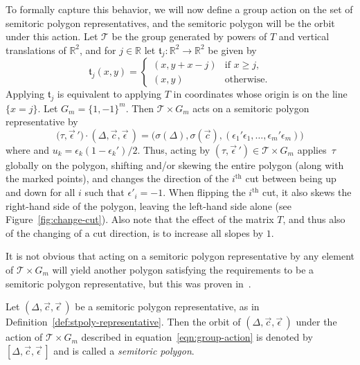 \documentclass[10pt,a4paper]{amsart}
\numberwithin{equation}{section}
\def\R{{\mathbb R}}
\newcommand{\De}{\Delta}
\newcommand{\stpoly}{[\De,\vec{c},\vec{\epsilon}\,]}
\newcommand{\strep}{(\De,\vec{c},\vec{\epsilon}\,)}
\theoremstyle{definition}
\theoremstyle{plain}
\theoremstyle{plain}
\begin{document}
To formally capture this behavior, we will now define a group action on the set of semitoric polygon representatives, and the semitoric polygon will be the orbit under this action.
Let $\mathcal{T}$ be the group generated by powers of $T$ and vertical translations of $\R^2$, and for $j\in\R$ let $\mathfrak{t}_j \colon \R^2\to\R^2$ be given by
\begin{equation}\label{eqn:frakt}
\mathfrak{t}_j(x,y)= \begin{cases}(x, y + x - j) & \textrm{if } x\geq j, \\ (x, y) & \textrm{otherwise.} \end{cases}
\end{equation}
Applying $\mathfrak{t}_j$ is equivalent to applying $T$ in coordinates whose origin is on the line $\{x=j\}$.
Let $G_m = \{1, -1\}^m$.
Then $\mathcal{T}\times G_m$ acts on a semitoric polygon representative by
\begin{equation}\label{eqn:group-action}
 \big(\tau,\vec{\epsilon}\,{}'\big)\cdot \strep = \big(\sigma(\De), \sigma(\vec{c}), (\epsilon_1' \epsilon_1,\ldots, \epsilon_m' \epsilon_m)\big)
\end{equation}
where  and
$u_k = \epsilon_k (1-\epsilon_k')/2$.
Thus, acting by $(\tau,\vec{\epsilon}\,{}')\in \mathcal{T}\times G_m$ applies~$\tau$ globally on the polygon, shifting and/or skewing the entire polygon (along with the marked points), and changes the direction of the $i^{\mathrm{th}}$ cut between being up and down for all $i$ such that $\epsilon'_i = -1$.
When flipping the $i^{\mathrm{th}}$ cut, it also skews the right-hand side of the polygon, leaving the left-hand side alone (see Figure~\ref{fig:change-cut}).
Also note that the effect of the matrix $T$, and thus also of the changing of a cut direction, is to increase all slopes by $1$.

It is not obvious that acting on a semitoric polygon representative by any element of $\mathcal{T}\times G_m$ will yield another polygon satisfying the requirements to be a semitoric polygon representative, but this was proven in~\cite[Lemma 4.2]{PeVN2011}.

\begin{Definition}\label{def:semitoric-polygon}
Let $\strep$ be a semitoric polygon representative, as in Definition~\ref{def:stpoly-representative}. Then the orbit of $\strep$ under the action of $\mathcal{T}\times G_m$ described in equation~\eqref{eqn:group-action} is denoted by~$\stpoly$ and is called a \emph{semitoric polygon}.
\end{Definition}
\end{document}
